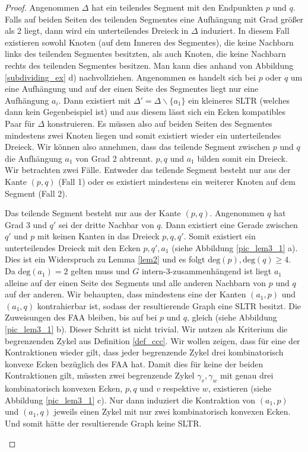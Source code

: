 \begin{proof}
Angenommen $\Delta$ hat ein teilendes Segment mit den Endpunkten $p$ und $q$. Falls auf beiden Seiten des teilenden Segmentes eine Aufhängung mit Grad größer als 2 liegt, dann wird ein unterteilendes Dreieck in $\Delta$ induziert. In diesem Fall existieren sowohl Knoten (auf dem Inneren des Segmentes), die keine Nachbarn links des teilenden Segmentes besitzten, als auch Knoten, die keine Nachbarn rechts des teilenden Segmentes besitzen. Man kann dies anhand von Abbildung \ref{subdividing_ex} d) nachvollziehen. Angenommen es handelt sich bei $p$ oder $q$ um eine Aufhängung und auf der einen Seite des Segmentes liegt nur eine Aufhängung $a_i$. Dann existiert mit $\Delta' = \Delta \backslash \{a_1\}$ ein kleineres SLTR (welches dann kein Gegenbeispiel ist) und aus diesem lässt sich ein Ecken kompatibles Paar für $\Delta$ konstruieren. Es müssen also auf beiden Seiten des Segmentes mindestens zwei Knoten liegen und somit existiert wieder ein unterteilendes Dreieck. Wir können also annehmen, dass das teilende Segment zwischen $p$ und $q$ die Aufhängung $a_1$ von Grad 2 abtrennt. $p,q$ und $a_1$ bilden somit ein Dreieck. Wir betrachten zwei Fälle. Entweder das teilende Segment besteht nur aus der Kante $(p,q)$ (Fall 1) oder es existiert mindestens ein weiterer Knoten auf dem Segment (Fall 2).

\begin{description}[leftmargin =0pt, font = \bfseries]
\item[Fall 1] Das teilende Segment besteht nur aus der Kante $(p,q)$. Angenommen $q$ hat Grad 3 und $q'$ sei der dritte Nachbar von $q$. Dann existiert eine Gerade zwischen $q'$ und $p$ mit keinen Kanten in das Dreieck $p,q,q'$. Somit existiert ein unterteilendes Dreieck mit den Ecken $p,q',a_1$ (siehe Abbildung \ref{pic_lem3_1} a). Dies ist ein Widerspruch zu Lemma \ref{lem2} und es folgt $\text{deg}(p),\text{deg}(q) \geq 4$. Da $\text{deg}(a_1) = 2$ gelten muss und $G$ intern-3-zusammenhängend ist liegt $a_1$ alleine auf der einen Seite des Segments und alle anderen Nachbarn von $p$ und $q$ auf der anderen. 
Wir behaupten, dass mindestens eine der Kanten $(a_1,p)$ und $(a_1,q)$ kontrahierbar ist, sodass der resultierende Graph eine SLTR besitzt. Die Zuweisungen des FAA bleiben, bis auf bei $p$ und $q$, gleich (siehe Abbildung \ref{pic_lem3_1} b). Dieser Schritt ist nicht trivial. Wir nutzen als Kriterium die begrenzenden Zykel aus Definition \ref{def_ccc}. Wir wollen zeigen, dass für eine der Kontraktionen wieder gilt, dass jeder begrenzende Zykel drei kombinatorisch konvexe Ecken bezüglich des FAA hat. Damit dies für keine der beiden Kontraktionen gilt, müssten zwei begrenzende Zykel $\gamma_v,\gamma_w$ mit genau drei kombinatorisch konvexen Ecken, $p,q$ und $v$ respektive $w$, existieren (siehe Abbildung \ref{pic_lem3_1} c). Nur dann induziert die Kontraktion von $(a_1,p)$ und $(a_1,q)$ jeweils einen Zykel mit nur zwei kombinatorisch konvexen Ecken. Und somit hätte der resultierende Graph keine SLTR.


\end{description}
\end{proof}
